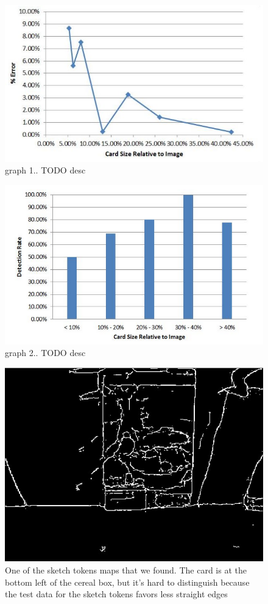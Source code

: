 \documentclass[10pt,twocolumn,letterpaper]{article}
\begin{document}
\begin{figure}[t]
\begin{center}
	   \includegraphics[width=0.8\linewidth]{graph1}
\end{center}
   \caption{graph 1.. TODO desc}
\label{fig:graph1}
\end{figure}



\begin{figure}[t]
\begin{center}
	   \includegraphics[width=0.8\linewidth]{graph2}
\end{center}
   \caption{graph 2.. TODO desc}
\label{fig:graph2}
\end{figure}


\begin{figure}[t]
\begin{center}
	   \includegraphics[width=0.8\linewidth]{sketchtokensmap}
\end{center}
   \caption{One of the sketch tokens maps that we found. The card is at the bottom left of the cereal box, but it's hard to distinguish because the test data for the sketch tokens favors less straight edges}
\label{fig:sketchtokensmap}
\end{figure}
\end{document}
